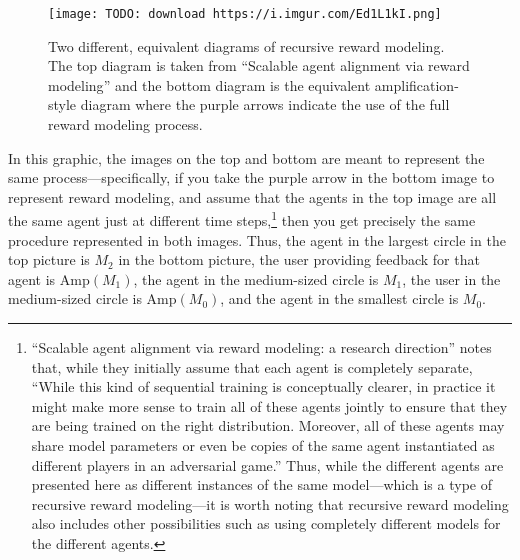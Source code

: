 \documentclass[
  onecolumn,
  natbib,
]{miri-tech-article}
\begin{document}
\begin{figure}[h!]
  \centering
  \texttt{[image: TODO: download https://i.imgur.com/Ed1L1kI.png]}
  \caption{Two different, equivalent diagrams of recursive reward modeling. The top diagram is taken from ``Scalable agent alignment via reward modeling\cite{TODO: cite https://medium.com/@deepmindsafetyresearch/scalable-agent-alignment-via-reward-modeling-bf4ab06dfd84}'' and the bottom diagram is the equivalent amplification-style diagram where the purple arrows indicate the use of the full reward modeling process.}
\end{figure}

In this graphic, the images on the top and bottom are meant to represent the same process---specifically, if you take the purple arrow in the bottom image to represent reward modeling, and assume that the agents in the top image are all the same agent just at different time steps,\footnote{``Scalable agent alignment via reward modeling: a research direction\cite{TODO: cite https://arxiv.org/abs/1811.07871}'' notes that, while they initially assume that each agent is completely separate, ``While this kind of sequential training is conceptually clearer, in practice it might make more sense to train all of these agents jointly to ensure that they are being trained on the right distribution. Moreover, all of these agents may share model parameters or even be copies of the same agent instantiated as different players in an adversarial game.'' Thus, while the different agents are presented here as different instances of the same model---which is a type of recursive reward modeling---it is worth noting that recursive reward modeling also includes other possibilities such as using completely different models for the different agents.} then you get precisely the same procedure represented in both images. Thus, the agent in the largest circle in the top picture is $M_2$ in the bottom picture, the user providing feedback for that agent is $\text{Amp}(M_1)$, the agent in the medium-sized circle is $M_1$, the user in the medium-sized circle is $\text{Amp}(M_0)$, and the agent in the smallest circle is $M_0$.
\end{document}
